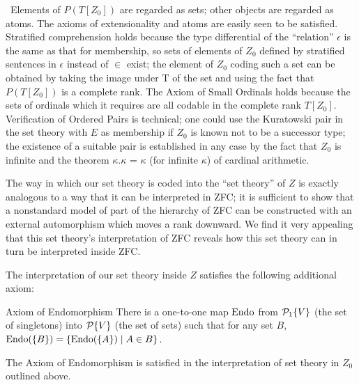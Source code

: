 \preuve\ Elements of $P(T[Z_0])$ are regarded as
sets; other objects are regarded as atoms.  The axioms of
extensionality and atoms are easily seen to be satisfied.
Stratified comprehension holds because
the type differential of the 
``relation'' $\epsilon$ is the same as that for membership,
so sets of elements of $Z_0$ defined by stratified sentences in $\epsilon$
instead of $\in$ exist; the element of $Z_0$ coding such a set can
be obtained by taking the image under T of the set and using the
fact that $P(T[Z_0])$ is a complete rank.  The Axiom of Small
Ordinals holds because the sets of
ordinals which it requires are 
all codable in the complete rank $T[Z_0]$.  Verification of Ordered
Pairs is technical; one could use the Kuratowski
pair in the set 
theory with $E$ as membership if $Z_0$ is known not to be a
successor type; the existence of a suitable pair is
established in any case by the fact that $Z_0$ is infinite
and the theorem $\kappa$.$\kappa$ = $\kappa$ (for infinite $\kappa$) of
cardinal arithmetic.
\finpreuve

The way in which our set theory is coded into the ``set theory'' of
$Z$ is exactly analogous to a way that it can be interpreted in
ZFC; it is sufficient to show that a
nonstandard model of part of the hierarchy of ZFC can be constructed with an
external automorphism which moves a rank downward.  We find it very appealing
that this set theory's interpretation of ZFC reveals how this
set theory can in turn be interpreted inside ZFC.

The interpretation of our set theory inside $Z$ satisfies the
following additional axiom:

\begin{axiom}{Axiom of Endomorphism}
 There is a one-to-one map\/ $\mathop{\mathrm{Endo}}$ from
 ${\cal P}_1\{V\}$ (the set of singletons) into ${\cal
 P}\{V\}$ (the set of sets) such that for any set $B$, $\mathop{\mathrm{Endo}}(\{B\}) =
 \{\mathop{\mathrm{Endo}}(\{A\})\mid A \in B\}$.
\end{axiom}

\begin{thm}
 The Axiom of Endomorphism is satisfied in the
 interpretation of set theory in $Z_0$ outlined above.
\end{thm}


